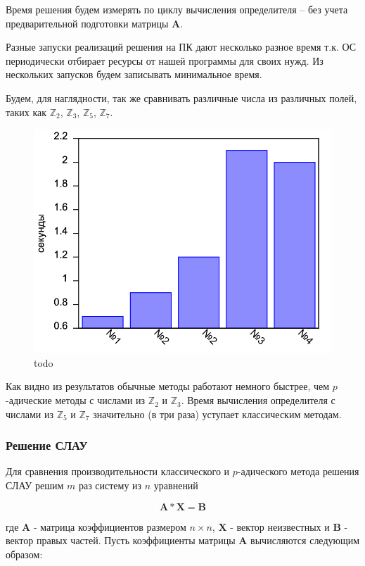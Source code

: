 \documentclass[master, och, diploma, times]{sty/SCWorks}
\theoremstyle{plain}
\theoremstyle{definition}
\begin{document}
Время решения будем измерять по циклу вычисления определителя – без учета предварительной подготовки матрицы $\boldsymbol{A}$.

Разные запуски реализаций решения на ПК дают несколько разное время т.к. ОС периодически отбирает ресурсы от нашей программы для своих нужд. Из нескольких запусков будем записывать минимальное время.

Будем, для наглядности, так же сравнивать различные числа из различных полей, таких как $\mathbb{Z}_2$, $\mathbb{Z}_3$, $\mathbb{Z}_5$, $\mathbb{Z}_7$.

\begin{figure}[H]
\centerline{\includegraphics[width=0.85\linewidth]{../gnuplot/single/det/plot.png}}
\caption{todo}
\label{img:single:det}
\end{figure}

Как видно из результатов обычные методы работают немного быстрее, чем $p$-адические методы с числами из $\mathbb{Z}_2$ и $\mathbb{Z}_3$. Время вычисления определителя с числами из $\mathbb{Z}_5$ и $\mathbb{Z}_7$ значительно (в три раза) уступает классическим методам.


\subsubsection{Решение СЛАУ}
Для сравнения производительности классического и $p$-адического метода решения СЛАУ решим $m$ раз систему из $n$ уравнений 

$$
\boldsymbol{A}*\boldsymbol{X}=\boldsymbol{B}
$$

\noindent где $\boldsymbol{A}$ - матрица коэффициентов размером $n \times n$, $\boldsymbol{X}$ - вектор неизвестных и $\boldsymbol{B}$ - вектор правых частей.
Пусть коэффициенты матрицы $\boldsymbol{A}$ вычисляются следующим образом:
\end{document}
